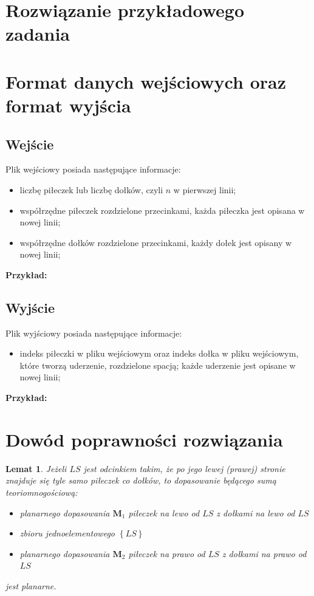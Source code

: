 \documentclass[10pt,a4paper]{article}
\newtheorem{lemma}{Lemat}
\begin{document}
	\section{Rozwiązanie przykładowego zadania}
	
	\section{Format danych wejściowych oraz format wyjścia}
	
	\subsection{Wejście}
	
	Plik wejściowy posiada następujące informacje:
	\begin{itemize}
		\item liczbę piłeczek lub liczbę dołków, czyli $n$ w pierwszej linii;
		\item współrzędne piłeczek rozdzielone przecinkami, każda piłeczka jest opisana w nowej linii;
		\item współrzędne dołków rozdzielone przecinkami, każdy dołek jest opisany w nowej linii;
	\end{itemize}

	\textbf{Przykład:} 
	
	\subsection{Wyjście}
	
	Plik wyjściowy posiada następujące informacje:
	\begin{itemize}
		\item indeks piłeczki w pliku wejściowym oraz indeks dołka w pliku wejściowym, które tworzą uderzenie, rozdzielone spacją; każde uderzenie jest opisane w nowej linii;
	\end{itemize}
	
	\textbf{Przykład:} 
	
	\section{Dowód poprawności rozwiązania}
	
	\begin{lemma}
		Jeżeli $LS$ jest odcinkiem takim, że po jego lewej (prawej) stronie znajduje się tyle samo piłeczek co dołków, to dopasowanie będącego sumą teoriomnogościową:
		\begin{itemize}
			\item planarnego dopasowania $\mathbf{M}_{1}$ piłeczek na lewo od $LS$ z dołkami na lewo od $LS$
			\item zbioru jednoelementowego $\left\{LS\right\}$
			\item planarnego dopasowania $\mathbf{M}_{2}$ piłeczek na prawo od $LS$ z dołkami na prawo od $LS$
		\end{itemize}
		jest planarne.
	\end{lemma}
\end{document}
